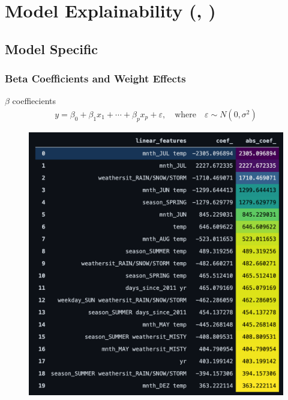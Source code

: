 \documentclass[10pt]{beamer}
\begin{document}
\section{Model Explainability (\cite{molnar2019}, \cite{masis2021})}

\subsection{Model Specific} 

\subsubsection{Beta Coefficients and Weight Effects}

\begin{frame}{$\beta$ coeffiecients}
\begin{align*}
y = \beta_{0} + \beta_{1}x_{1} + \cdots + \beta_{p}x_{p} + \varepsilon, \quad \text{where} \quad \varepsilon \sim N(0, \sigma^2)
\end{align*}
\begin{center}
  \begin{figure}
    \includegraphics[scale=0.3]{images/lm_beta_table.png} 
  \end{figure}
\end{center}
\end{frame}
\end{document}

